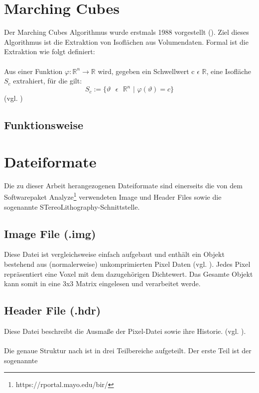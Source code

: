\section{Marching Cubes}
Der Marching Cubes Algorithmus wurde erstmals 1988 vorgestellt (\cite{MCAlgo}). Ziel dieses Algorithmus ist die Extraktion von Isoflächen aus Volumendaten. Formal ist die Extraktion wie folgt definiert: 
\\\\
Aus einer Funktion $\varphi : \mathbb{R}^{n} \rightarrow \mathbb{R }$ wird, gegeben ein Schwellwert   c $\epsilon$ $ \mathbb{ R} $, eine
Isofläche $S_{c}$ extrahiert, für die gilt:
\begin{equation}
S_{c} := \{ \vartheta \text{ } \epsilon \text{ } \mathbb{R}^{n} \text{ | } \varphi(\vartheta) = c\}
\end{equation} 
(vgl. \cite{SeibtBak})

\subsection{Funktionsweise}

\section{Dateiformate}
Die zu dieser Arbeit herangezogenen Dateiformate sind einerseits die von dem Softwarepaket Analyze\footnote{https://rportal.mayo.edu/bir/} verwendeten Image und Header Files sowie die sogenannte STereoLithography-Schnittstelle. 

\subsection{Image File (.img)}
Diese Datei ist vergleichsweise einfach aufgebaut und enthält ein Objekt bestehend aus (normalerweise) unkomprimierten Pixel Daten (vgl. \cite{AnalyzeFormat}). Jedes Pixel repräsentiert eine Voxel mit dem dazugehörigen Dichtewert. Das Gesamte Objekt kann somit in eine 3x3 Matrix eingelesen und verarbeitet werde.

\subsection{Header File (.hdr)}
Diese Datei beschreibt die Ausmaße der Pixel-Datei sowie ihre Historie. (vgl. \cite{AnalyzeFormat}). \\\\
Die genaue Struktur nach \cite{AnalyzeFormat} ist in drei Teilbereiche aufgeteilt. Der erste Teil ist der sogenannte 

